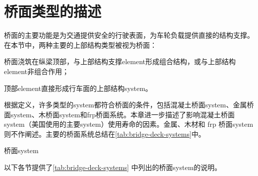 \section{桥面类型的描述}
\label{sec:bridge-deck-types}
桥面的主要功能是为交通提供安全的行驶表面，为车轮负载提供直接的结构支撑。在本节中，两种主要的上部结构类型被视为桥面：
\begin{enumerate*}
  \item 桥面浇筑在纵梁顶部，与上部结构支撑\gls*{element}形成组合结构，或与上部结构\gls*{element}非组合作用；
  \item 顶部\gls*{element}直接形成行车面的上部结构\gls*{system}。
\end{enumerate*}

根据定义，许多类型的\gls*{system}都符合桥面的条件，包括混凝土桥面\gls*{system}、金属桥面\gls*{system}、木桥面\gls*{system}和\acrfull*{frp}桥面系统。本章进一步描述了影响混凝土桥面\gls*{system}（美国使用的主要\gls*{system}）使用寿命的因素。金属、木材和 \acrshort*{frp} 桥面\gls*{system}则不作阐述。主要的桥面系统总结在\cref{tab:bridge-deck-systems}中。

\begin{table}
  \caption{桥面\gls*{system}}
  \label{tab:bridge-deck-systems}
  
\end{table}

以下各节提供了\cref{tab:bridge-deck-systems} 中列出的桥面\gls*{system}的说明。

